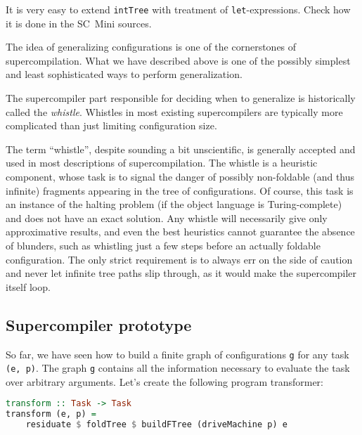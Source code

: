 \begin{exercise}
It is very easy to extend \texttt{intTree} with treatment of \texttt{let}-expressions.
Check how it is done in the SC~Mini sources.
\end{exercise}

The idea of generalizing configurations is one of the cornerstones of supercompilation.
What we have described above is one of the possibly simplest and 
least sophisticated ways to perform generalization.

The supercompiler part responsible for deciding when to generalize is
historically called the \emph{whistle}.
Whistles in most existing supercompilers are typically more complicated
than just limiting configuration size.

The term ``whistle'', despite sounding a bit unscientific, is generally accepted
and used in most descriptions of supercompilation.
The whistle is a heuristic component, whose task is to signal the danger of
possibly non-foldable (and thus infinite) fragments appearing in the tree of configurations.
Of course, this task is an instance of the halting problem
(if the object language is Turing-complete) and does not have an exact solution.
Any whistle will necessarily give only approximative results, and even the
best heuristics cannot guarantee the absence of blunders, such as
whistling just a few steps before an actually foldable configuration.
The only strict requirement is to always err on the side of caution
and never let infinite tree paths slip through, as it would make
the supercompiler itself loop.

\subsection{Supercompiler prototype}

So far, we have seen how to build a finite graph of configurations  \texttt{g} for any task \texttt{(e, p)}.
The graph \texttt{g} contains all the information necessary to evaluate the task over arbitrary arguments.
%
Let's create the following program transformer:
\begin{lstlisting}[language=haskell]
transform :: Task -> Task
transform (e, p) =
	residuate $ foldTree $ buildFTree (driveMachine p) e
\end{lstlisting}

